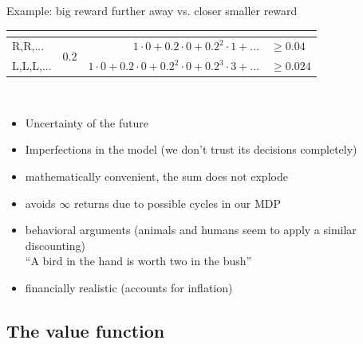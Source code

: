 \begin{frame}{Example: big reward further away vs. closer smaller reward}
{\begin{table}[h]
{\begin{tabular}{lcrl}
                                & \multicolumn{1}{l}{}               & \multicolumn{1}{l}{}                                                       &                                                 \\ \hline
\multicolumn{1}{|l|}{R,R,...}   & \multicolumn{1}{c|}{\multirow{2}{*}{$0.2$}}         & $1 \cdot 0 + 0.2 \cdot 0 + 0.2^2 \cdot 1 + \ldots$                                     & \multicolumn{1}{l|}{$\ge \mathbf{0.04}$}                  \\   \cline{1-1} \cline{3-4}
\multicolumn{1}{|l|}{L,L,L,...} & \multicolumn{1}{l|}{}              & $1 \cdot 0 + 0.2 \cdot 0 + 0.2^2 \cdot 0 + 0.2^3 \cdot 3 +\ldots$              & \multicolumn{1}{l|}{$\ge {0.024}$}                \\ \hline
\end{tabular}%
}

\end{table}
}

\end{frame}

\begin{frame}

\\

\pause

\begin{itemize}
\item Uncertainty of the future
\item Imperfections in the model (we don't trust its decisions completely)
\item mathematically convenient, the sum does not explode
\item avoids $\infty$ returns due to possible cycles in our MDP
\item behavioral arguments (animals and humans seem to apply a similar discounting)\\
``A bird in the hand is worth two in the bush''
\item financially realistic (accounts for inflation)
\end{itemize}

\end{frame} 

\newpage

\subsection{The value function}


